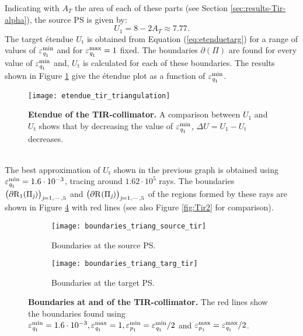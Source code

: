 Indicating with $A_T$ the area of each of these parts (see Section \ref{sec:results-Tir-alpha}), the source PS is given by:
\begin{equation}
U_1 = 8-2A_T\approx 7.77.
\end{equation}
The target \'{e}tendue $U_{\textrm{t}}$ is obtained from Equation (\ref{eq:etenduetarg}) for a range of values of $\varepsilon_{\textit{q}_1}^{\textrm{min}}$ and for $\varepsilon_{\textit{q}_1}^{\textrm{max}}=1$ fixed. The boundaries $\partial$$(\Pi)$ are found for every value of $\varepsilon_{\textit{q}_1}^{\textrm{min}}$ and, $U_{\textrm{t}}$ is calculated for each of these boundaries. 
The results shown in Figure \ref{fig:etendue_tir_triangulation} give the \'{e}tendue plot as a function of $\varepsilon_{\textit{q}_{1}}^{\textrm{min}}$.
 \begin{figure}[t]
  \center
  \texttt{[image: etendue\_tir\_triangulation]}
  \caption{\textbf{Etendue of the TIR-collimator.} A comparison between $U_1$ and $U_{\textrm{t}}$ shows that by decreasing the value of $\varepsilon_{\textit{q}_{1}}^{\textrm{min}}$, $\Delta U= U_1-U_{\textrm{t}}$ decreases.}
  \label{fig:etendue_tir_triangulation}
\end{figure}
\\ \indent 
The best approximation of $U_{\textrm{t}}$ shown in the previous graph is obtained using $\varepsilon_{\textit{q}_1}^{\textrm{min}}=1.6\cdot 10^{-3}$, tracing around $1.62 \cdot 10^5$ rays. The boundaries $\big(\partial\mbox{$\textup{R}_{\textit{$1$}}$}(\Pi_{\textit{j}})\big)_{\textit{j} = 1, \cdots, 5}$ and $\big(\partial\mbox{$\textup{R}_{\textit{}}$}(\Pi_{\textit{j}})\big)_{\textit{j} = 1, \cdots, 5}$ of the regions formed by these rays are shown in Figure \ref{fig:boundaries_TIR_triangulation} with red lines (see also Figure \ref{fig:Tir2} for comparison). 
\begin{figure}[h]
 \begin{subfigure}[t]{0.5\textwidth}
\centering
    \texttt{[image: boundaries\_triang\_source\_tir]}
    \caption{Boundaries at the source PS.}
    \label{fig:boundaries_triang_source_tir}
\end{subfigure}
\hfill
\begin{subfigure}[t]{0.5\textwidth}
\centering
    \texttt{[image: boundaries\_triang\_targ\_tir]}
    \caption{Boundaries at the target PS.}
    \label{fig:boundaries_triang_target_tir}
\end{subfigure}
\caption{\textbf{Boundaries at  and  of the TIR-collimator.} The red lines show the boundaries found using $\varepsilon_{\textit{q}_1}^{\textrm{min}}=1.6\cdot 10^{-3}, \varepsilon_{\textit{q}_1}^{\textrm{max}}=1, \varepsilon_{\textit{p}_1}^{\textrm{min}}=\varepsilon_{\textit{q}_1}^{\textrm{min}}/2$ and $\varepsilon_{\textit{p}_1}^{\textrm{max}} = \varepsilon_{\textit{q}_1}^{\textrm{max}}/2$.}
 \label{fig:boundaries_TIR_triangulation}
\end{figure}
